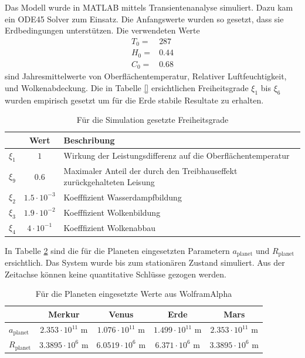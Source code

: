 \begin{refsection}
Das Modell wurde in MATLAB mittels Transientenanalyse simuliert. Dazu kam ein ODE45 Solver zum Einsatz. Die Anfangswerte wurden so gesetzt, dass sie Erdbedingungen unterstützen. Die verwendeten Werte
\begin{equation}
\begin{matrix}
T_0 = & 287 \\
H_0 = & 0.44 \\
C_0 = & 0.68
\end{matrix}
\end{equation}sind Jahresmittelwerte von Oberflächentemperatur, Relativer Luftfeuchtigkeit, und Wolkenabdeckung.
Die in Tabelle \ref{} ersichtlichen Freiheitsgrade $\xi_1$ bis $\xi_6$ wurden empirisch gesetzt um für die Erde stabile Resultate zu erhalten.
\begin{center}
\begin{table}[!h]
	\center
	\begin{tabular}{c|c|l}
        & Wert                  & Beschribung \\
  \hline
$\xi_1$ & $1$					& Wirkung der Leistungsdifferenz auf die Oberflächentemperatur\\
$\xi_9$ & $0.6$					& Maximaler Anteil der durch den Treibhauseffekt zurückgehalteten Leisung\\
$\xi_2$ & $1.5 \cdot 10^{-3}$	& Koefffizient Wasserdampfbildung\\
$\xi_3$ & $1.9 \cdot 10^{-2}$	& Koefffizient Wolkenbildung \\
$\xi_4$ & $4   \cdot 10^{-1}$	& Koefffizient Wolkenabbau
	\end{tabular}
	\caption{Für die Simulation gesetzte Freiheitsgrade}
	\label{planeten:xiValues}
\end{table}
\end{center}
In Tabelle \ref{planeten:planetValues} sind die für die Planeten eingesetzten Parametern $a_{\text{planet}}$ und $R_{\text{planet}}$ ersichtlich. Das System wurde bis zum stationären Zustand simuliert. Aus der Zeitachse können keine quantitative Schlüsse gezogen werden.
\begin{center}
\begin{table}[!h]
	\center
	\begin{tabular}{l|c c c c}
                        & Merkur                    & Venus                    & Erde                    & Mars     \\
  \hline
  $a_{\text{planet}}$   & $2.353 \cdot 10^{11}$ m   & $1.076 \cdot 10^{11}$ m  & $1.499 \cdot 10^{11}$ m & $2.353 \cdot 10^{11}$ m \\
  $R_{\text{planet}}$   & $3.3895 \cdot 10^{6}$ m   & $6.0519 \cdot 10^{6}$ m  & $6.371 \cdot 10^{6}$ m  & $3.3895 \cdot 10^{6}$ m 
\end{tabular}
\caption{Für die Planeten eingesetzte Werte aus WolframAlpha}
\label{planeten:planetValues}
\end{table}
\end{center}


\end{refsection}
